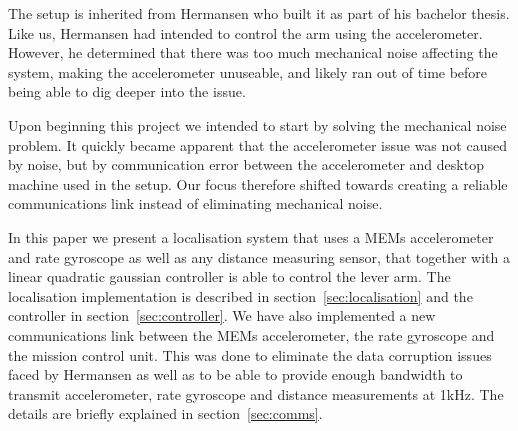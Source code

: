 The setup is inherited from Hermansen who built it as part of his bachelor thesis\cite{Hermansen2013a}.
Like us, Hermansen had intended to control the arm using the accelerometer. However, he determined that there was too much mechanical 
noise affecting the system, making the accelerometer unuseable, and likely ran out of time before being able to dig deeper into the 
issue.

Upon beginning this project we intended to start by solving the mechanical noise problem. It quickly became apparent that the 
accelerometer issue was not caused by noise, but by communication error between the accelerometer and desktop machine used in the setup.
Our focus therefore shifted towards creating a reliable communications link instead of eliminating mechanical noise.

In this paper we present a localisation system that uses a MEMs accelerometer and rate gyroscope as well as any distance measuring sensor,
that together with a linear quadratic gaussian controller is able to control the lever arm. The localisation implementation is described
in section~\ref{sec:localisation} and the controller in section~\ref{sec:controller}.
We have also implemented a new communications 
link between the MEMs accelerometer, the rate gyroscope and the mission control unit. This was done to eliminate the data corruption 
issues faced by Hermansen as well as to be able to provide enough bandwidth to transmit accelerometer, rate gyroscope and distance 
measurements at 1kHz. The details are briefly explained in section~\ref{sec:comms}. 
